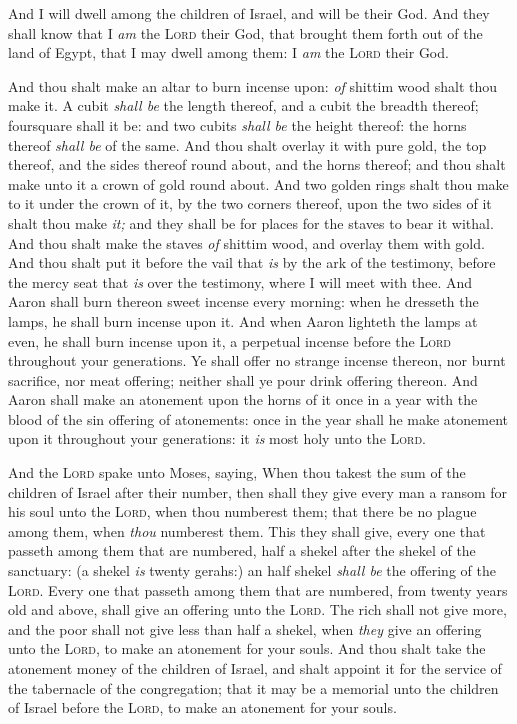 \documentclass[11pt,letterpaper,oneside]{memoir}
\begin{document}
And I will dwell among the children of Israel, and will be their God.
And they shall know that I \emph{am} the \textsc{Lord} their God, that
brought them forth out of the land of Egypt, that I may dwell among
them: I \emph{am} the \textsc{Lord} their God.

And thou shalt make an altar to burn incense upon: \emph{of} shittim
wood shalt thou make it. A cubit \emph{shall be} the length thereof, and
a cubit the breadth thereof; foursquare shall it be: and two cubits
\emph{shall be} the height thereof: the horns thereof \emph{shall be} of
the same. And thou shalt overlay it with pure gold, the top thereof, and
the sides thereof round about, and the horns thereof; and thou shalt
make unto it a crown of gold round about. And two golden rings shalt
thou make to it under the crown of it, by the two corners thereof, upon
the two sides of it shalt thou make \emph{it;} and they shall be for
places for the staves to bear it withal. And thou shalt make the staves
\emph{of} shittim wood, and overlay them with gold. And thou shalt put
it before the vail that \emph{is} by the ark of the testimony, before
the mercy seat that \emph{is} over the testimony, where I will meet with
thee. And Aaron shall burn thereon sweet incense every morning: when he
dresseth the lamps, he shall burn incense upon it. And when Aaron
lighteth the lamps at even, he shall burn incense upon it, a perpetual
incense before the \textsc{Lord} throughout your generations. Ye shall
offer no strange incense thereon, nor burnt sacrifice, nor meat
offering; neither shall ye pour drink offering thereon. And Aaron shall
make an atonement upon the horns of it once in a year with the blood of
the sin offering of atonements: once in the year shall he make atonement
upon it throughout your generations: it \emph{is} most holy unto the
\textsc{Lord}.

And the \textsc{Lord} spake unto Moses, saying, When thou takest the sum
of the children of Israel after their number, then shall they give every
man a ransom for his soul unto the \textsc{Lord}, when thou numberest
them; that there be no plague among them, when \emph{thou} numberest
them. This they shall give, every one that passeth among them that are
numbered, half a shekel after the shekel of the sanctuary: (a shekel
\emph{is} twenty gerahs:) an half shekel \emph{shall be} the offering of
the \textsc{Lord}. Every one that passeth among them that are numbered,
from twenty years old and above, shall give an offering unto the
\textsc{Lord}. The rich shall not give more, and the poor shall not give
less than half a shekel, when \emph{they} give an offering unto the
\textsc{Lord}, to make an atonement for your souls. And thou shalt take
the atonement money of the children of Israel, and shalt appoint it for
the service of the tabernacle of the congregation; that it may be a
memorial unto the children of Israel before the \textsc{Lord}, to make
an atonement for your souls.
\end{document}
